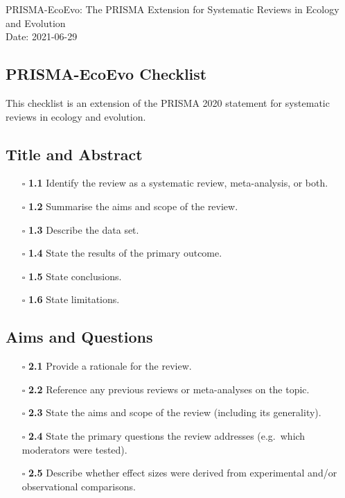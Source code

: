\documentclass[11pt]{article}
\def\tightlist{}
\begin{document}
\begin{center}
{\LARGE PRISMA-EcoEvo: The PRISMA Extension for Systematic Reviews in
Ecology and Evolution}\\[4pt]
\normalsize Date: 2021-06-29
\end{center}
\vspace{1em}

\begin{Form}

\section{PRISMA-EcoEvo Checklist}\label{prisma-ecoevo-checklist}

This checklist is an extension of the PRISMA 2020 statement for
systematic reviews in ecology and evolution.

\subsection{Title and Abstract}\label{title-and-abstract}

\begin{itemize}
\tightlist
\item[$\square$]
  \textbf{1.1} Identify the review as a systematic review,
  meta-analysis, or both.
\item[$\square$]
  \textbf{1.2} Summarise the aims and scope of the review.
\item[$\square$]
  \textbf{1.3} Describe the data set.
\item[$\square$]
  \textbf{1.4} State the results of the primary outcome.
\item[$\square$]
  \textbf{1.5} State conclusions.
\item[$\square$]
  \textbf{1.6} State limitations.
\end{itemize}

\subsection{Aims and Questions}\label{aims-and-questions}

\begin{itemize}
\tightlist
\item[$\square$]
  \textbf{2.1} Provide a rationale for the review.
\item[$\square$]
  \textbf{2.2} Reference any previous reviews or meta-analyses on the
  topic.
\item[$\square$]
  \textbf{2.3} State the aims and scope of the review (including its
  generality).
\item[$\square$]
  \textbf{2.4} State the primary questions the review addresses
  (e.g.~which moderators were tested).
\item[$\square$]
  \textbf{2.5} Describe whether effect sizes were derived from
  experimental and/or observational comparisons.
\end{itemize}


\end{Form}
\end{document}
